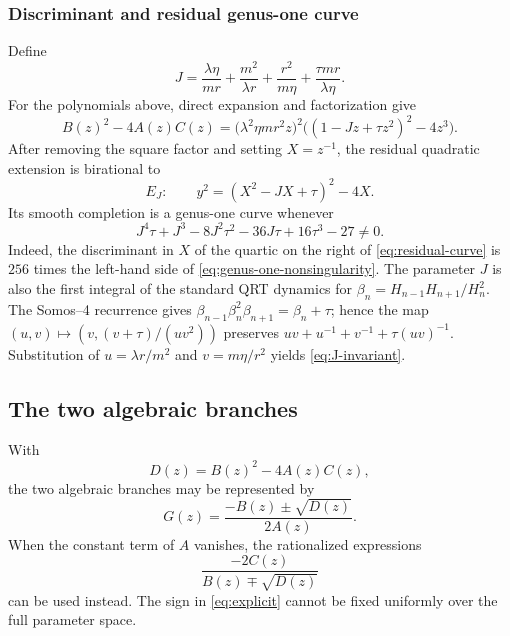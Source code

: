 \documentclass[11pt]{article}
\theoremstyle{remark}
\begin{document}
\subsubsection{Discriminant and residual genus-one curve}
Define
\begin{equation}
 J=\frac{\lambda\eta}{mr}+\frac{m^2}{\lambda r}
   +\frac{r^2}{m\eta}+\frac{\tau mr}{\lambda\eta}.
 \label{eq:J-invariant}
\end{equation}
For the polynomials above, direct expansion and factorization give
\begin{equation}
 B(z)^2-4A(z)C(z)=\bigl(\lambda^2\eta m r^2 z\bigr)^2
 \bigl((1-Jz+\tau z^2)^2-4z^3\bigr).
 \label{eq:discriminant-factorization}
\end{equation}
After removing the square factor and setting $X=z^{-1}$, the residual
quadratic extension is birational to
\begin{equation}
 E_J:\qquad y^2=(X^2-JX+\tau)^2-4X.
 \label{eq:residual-curve}
\end{equation}
Its smooth completion is a genus-one curve whenever
\begin{equation}
 J^4\tau+J^3-8J^2\tau^2-36J\tau+16\tau^3-27\ne0.
 \label{eq:genus-one-nonsingularity}
\end{equation}
Indeed, the discriminant in $X$ of the quartic on the right of
\eqref{eq:residual-curve} is $256$ times the left-hand side of
\eqref{eq:genus-one-nonsingularity}.  The parameter $J$ is also the first
integral of the standard QRT dynamics for
$\beta_n=H_{n-1}H_{n+1}/H_n^2$.  The Somos--4 recurrence gives
$\beta_{n-1}\beta_n^2\beta_{n+1}=\beta_n+\tau$; hence the map
$(u,v)\mapsto(v,(v+\tau)/(uv^2))$ preserves
$uv+u^{-1}+v^{-1}+\tau(uv)^{-1}$.  Substitution of
$u=\lambda r/m^2$ and $v=m\eta/r^2$ yields \eqref{eq:J-invariant}.




\subsection{The two algebraic branches}

With
\[
 D(z)=B(z)^2-4A(z)C(z),
\]
the two algebraic branches may be represented by
\begin{equation}
 G(z)=\frac{-B(z)\mathbin{\pm}\sqrt{D(z)}}{2A(z)}.
 \label{eq:explicit}
\end{equation}
When the constant term of $A$ vanishes, the rationalized expressions
\[
 \frac{-2C(z)}{B(z)\mp\sqrt{D(z)}}
\]
can be used instead.  The sign in \eqref{eq:explicit} cannot be fixed
uniformly over the full parameter space.
\end{document}
